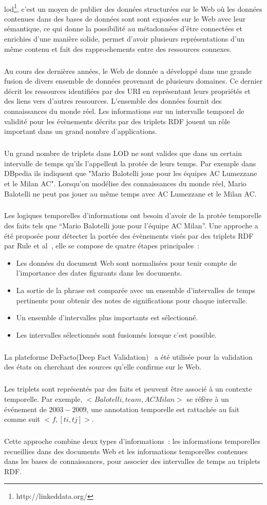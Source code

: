 \documentclass[12pt,a4	]{report}
\begin{document}
\paragraph{}
\gls{lod}\footnote{http://linkeddata.org/}, c'est un moyen de publier des données structurées sur le Web où les données contenues dans des bases de données sont sont exposées sur le Web avec leur sémantique, ce qui donne la possibilité au métadonnées d'être connectées et enrichies d'une manière solide, permet d'avoir plusieurs représentations d'un même contenu et fait des rapprochements entre des ressources connexes. 
\subparagraph{}
Au cours des dernières années, le Web de donnée a développé dans une grande fusion de divers ensemble de données provenant de plusieurs domaines. Ce dernier décrit les ressources identifiées par des URI en représentant leurs propriétés et des liens vers d’autres ressources. L'ensemble des données fournit des connaissances du monde réel. Les informations sur un intervalle temporel de validité pour les évènements décrits par des triplets RDF jouent un rôle important dans un grand nombre d'applications.
\subparagraph{}
Un grand nombre de triplets dans LOD ne sont valides que dans un certain intervalle de temps qu'ils l'appellent la protée de leurs temps.
Par exemple dans DBpedia ils indiquent que "Mario Balotelli joue pour les équipes AC Lumezzane et le Milan AC". Lorsqu'on modélise des connaissances du monde réel, Mario Balotelli ne peut pas jouer au même temps avec AC Lumezzane et le Milan AC.
\subparagraph{}
Les logiques temporelles d'informations ont besoin d'avoir de la protée temporelle des faits tels que “Mario Balotelli joue pour l'équipe AC Milan”.
Une approche a été proposée pour détecter la portée des évènements visés par des triplets RDF par Rule et al~\cite{rula2013}, elle se compose de quatre étapes principales~:
\begin{itemize}
\item Les données du document Web sont normalisées pour tenir compte de l’importance des dates figurants dans les documents.
\item La sortie de la phrase est comparée avec un ensemble d’intervalles de temps pertinents pour obtenir des notes de significations pour chaque intervalle.
\item Un ensemble d’intervalles plus importants est sélectionné.
\item Les intervalles sélectionnés sont fusionnés lorsque c’est possible.
\end{itemize}
\subparagraph{}
La plateforme DeFacto(Deep Fact Validation)~\cite{lehmann2012} a été utilisée pour la validation des états on cherchant des sources qu'elle confirme sur le Web.
\subparagraph{}
Les triplets sont représentés par des faits et peuvent être associé à un contexte temporelle.
Par exemple, $<Balotelli, team, AC Milan>$ se réfère à un événement de $2003-2009$, une annotation temporelle est rattachée au fait comme suit $<f, [ti,tj]>$.
\subparagraph{}
Cette approche combine deux types d'informations~: les informations temporelles recueillies dans des documents Web et les informations temporelles contenues dans les bases de connaissances, pour associer des intervalles de temps au triplets RDF.
\end{document}
